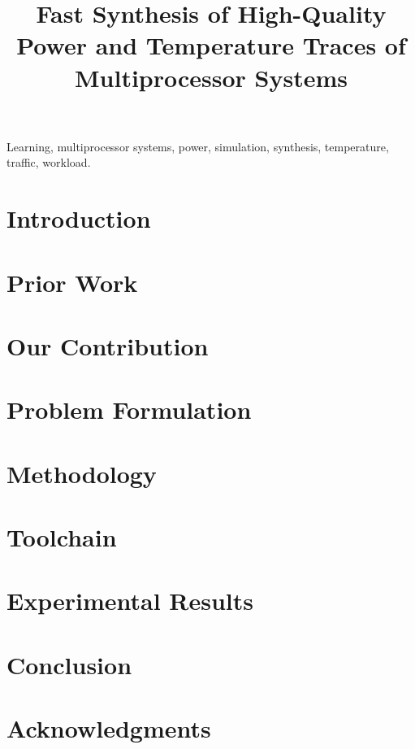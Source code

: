 \documentclass[conference]{IEEEtran}
\title{
  Fast Synthesis of High-Quality Power and Temperature Traces of
  Multiprocessor Systems
}
\author{}
\begin{document}
  \maketitle

  \begin{abstract}
    
  \end{abstract}

  \begin{IEEEkeywords}
    Learning,
    multiprocessor systems,
    power,
    simulation,
    synthesis,
    temperature,
    traffic,
    workload.
  \end{IEEEkeywords}


  \section{Introduction} 
  

  \section{Prior Work}

  \section{Our Contribution} 
  

  \section{Problem Formulation} 
  

  \section{Methodology} 
  

  \section{Toolchain} 
  

  \section{Experimental Results} 

  \section{Conclusion} 
  

  \section*{Acknowledgments}
  

  \begingroup
    
    
  \endgroup
\end{document}
